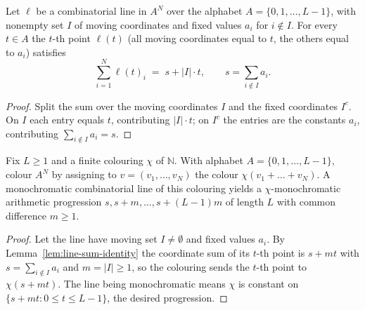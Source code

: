\begin{lemma}
    \label{lem:line-sum-identity}
    \leanok
    Let $\ell$ be a combinatorial line in $A^N$ over the alphabet
    $A = \{0, 1, \dots, L-1\}$, with nonempty set $I$ of moving coordinates and
    fixed values $a_i$ for $i \notin I$. For every $t \in A$ the $t$-th point
    $\ell(t)$ (all moving coordinates equal to $t$, the others equal to $a_i$)
    satisfies
    \[
        \sum_{i=1}^{N} \ell(t)_i \;=\; s + |I| \cdot t,
        \qquad s = \sum_{i \notin I} a_i .
    \]
\end{lemma}
\begin{proof}
    Split the sum over the moving coordinates $I$ and the fixed coordinates
    $I^{c}$. On $I$ each entry equals $t$, contributing $|I| \cdot t$; on $I^{c}$
    the entries are the constants $a_i$, contributing $\sum_{i \notin I} a_i = s$.
\end{proof}

\begin{lemma}
    \label{lem:line-to-progression}
    \leanok
    Fix $L \ge 1$ and a finite colouring $\chi$ of $\mathbb{N}$. With alphabet
    $A = \{0, 1, \dots, L-1\}$, colour $A^N$ by assigning to
    $v = (v_1, \dots, v_N)$ the colour $\chi(v_1 + \dots + v_N)$. A monochromatic
    combinatorial line of this colouring yields a $\chi$-monochromatic
    arithmetic progression $s, s + m, \dots, s + (L-1)m$ of length $L$ with
    common difference $m \ge 1$.
\end{lemma}
\begin{proof}
    Let the line have moving set $I \neq \emptyset$ and fixed values $a_i$. By
    Lemma~\ref{lem:line-sum-identity} the coordinate sum of its $t$-th point is
    $s + m t$ with $s = \sum_{i \notin I} a_i$ and $m = |I| \ge 1$, so the
    colouring sends the $t$-th point to $\chi(s + m t)$. The line being
    monochromatic means $\chi$ is constant on $\{s + m t : 0 \le t \le L-1\}$,
    the desired progression.
\end{proof}

